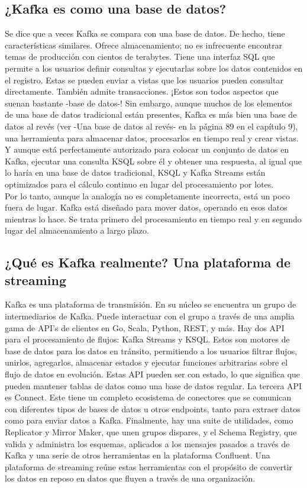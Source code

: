 \documentclass{article}
\begin{document}
\subsection{¿Kafka es como una base de datos?}
Se dice que a veces Kafka se compara con una base de datos. De hecho, tiene características similares. Ofrece almacenamiento; no es infrecuente encontrar temas de producción con cientos de terabytes. Tiene una interfaz SQL que permite a los usuarios definir consultas y ejecutarlas sobre los datos contenidos en el registro. Estas se pueden enviar a vistas que los usuarios pueden consultar directamente. También admite transacciones. ¡Estos son todos aspectos que suenan bastante -base de datos-!
Sin embargo, aunque muchos de los elementos de una base de datos tradicional están presentes, Kafka es más bien una base de datos al revés (ver -Una base de datos al revés- en la página 89 en el capítulo 9), una herramienta para almacenar datos, procesarlos en tiempo real y crear vistas. Y aunque está perfectamente autorizado para colocar un conjunto de datos en Kafka, ejecutar una consulta KSQL sobre él y obtener una respuesta, al igual que lo haría en una base de datos tradicional, KSQL y Kafka Streams están optimizados para el cálculo continuo en lugar del procesamiento por lotes.\\

Por lo tanto, aunque la analogía no es completamente incorrecta, está un poco fuera de lugar. Kafka está diseñado para mover datos, operando en esos datos mientras lo hace. Se trata primero del procesamiento en tiempo real y en segundo lugar del almacenamiento a largo plazo.

\subsection{¿Qué es Kafka realmente? Una plataforma de streaming}
Kafka es una plataforma de transmisión. En su núcleo se encuentra un grupo de intermediarios de Kafka. Puede interactuar con el grupo a través de una amplia gama de API's de clientes en Go, Scala, Python, REST, y más. Hay dos API para el procesamiento de flujos: Kafka Streams y KSQL. Estos son motores de base de datos para los datos en tránsito, permitiendo a los usuarios filtrar flujos, unirlos, agregarlos, almacenar estados y ejecutar funciones arbitrarias sobre el flujo de datos en evolución. Estas API pueden ser con estado, lo que significa que pueden mantener tablas de datos como una base de datos regular. La tercera API es Connect. Este tiene un completo ecosistema de conectores que se comunican con diferentes tipos de bases de datos u otros endpoints, tanto para extraer datos como para enviar datos a Kafka. Finalmente, hay una suite de utilidades, como Replicator y Mirror Maker, que unen grupos dispares, y el Schema Registry, que valida y administra los esquemas, aplicados a los mensajes pasados a través de Kafka y una serie de otros herramientas en la plataforma Confluent. Una plataforma de streaming reúne estas herramientas con el propósito de convertir los datos en reposo en datos que fluyen a través de una organización.\\
\end{document}
